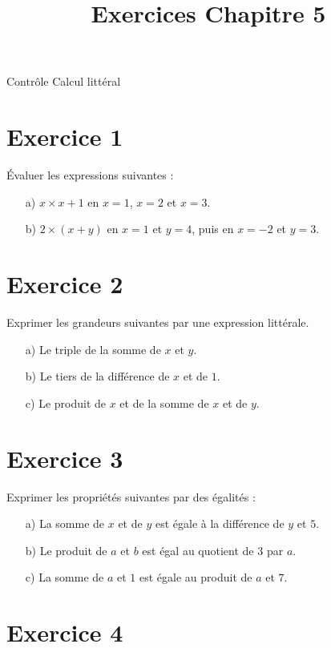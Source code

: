 \documentclass[12 pt]{article}
\title{Exercices Chapitre 5}
\date{}
\theoremstyle{plain}
\newcounter{n}
\numberwithin{n}{section}
\begin{document}
\begin{center}{\Large Contrôle Calcul littéral}\\ 
 \end{center}

\section{Exercice 1}

Évaluer les expressions suivantes : \begin{itemize}
\item[a) ]  $x \times x +1$ en $x=1$, $x=2$ et $x=3$.   
\item[b) ]  $2\times (x +y)$ en $x=1$ et $y=4$, puis en $x=-2$ et $y=3$.   
\end{itemize}
\section{Exercice 2}

Exprimer les grandeurs suivantes par une expression littérale. 

\begin{itemize}
\item[a) ] Le triple de la somme de $x$ et $y$.
\item[b) ] Le tiers de la différence de $x$ et de $1$. 
\item[c) ] Le produit de $x$ et de la somme de $x$ et de $y$. 
\end{itemize}

\section{Exercice 3}

Exprimer les propriétés suivantes par des égalités :

\begin{itemize}
\item[a) ] La somme de $x$ et de $y$ est égale à la différence de $y$ et $5$. 
\item[b)] Le produit de $a$ et $b$ est égal au quotient de $3$ par $a$. 
\item[c)] La somme de $a$ et $1$ est égale au produit de $a$ et $7$. 
\end{itemize}



\section{Exercice 4}
\end{document}
